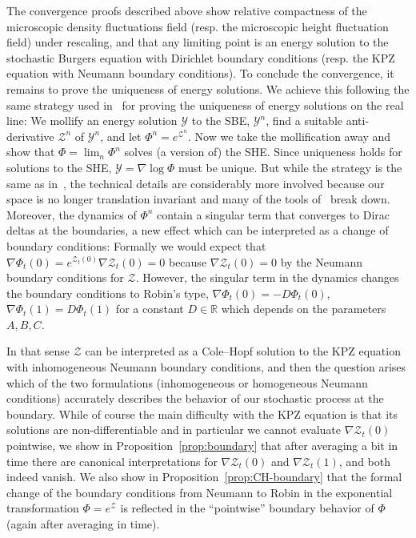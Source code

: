 \documentclass[AHL,Unicode,longabstracts]{cedram}
\newcommand{\bb}[1]{{\mathbb #1}}
\newcommand{\mc}[1]{{\mathcal #1}}
\renewcommand{\mc}[1]{{\mathcal #1}}
\begin{document}
The convergence proofs described above show relative compactness of the microscopic density fluctuations field (resp. the microscopic height fluctuation field) under rescaling, and that any limiting point is an energy solution to the stochastic Burgers equation with Dirichlet boundary conditions (resp. the KPZ equation with Neumann boundary conditions). To conclude the convergence, it remains to prove the uniqueness of energy solutions. We achieve this following the same strategy used in~\cite{Gubinelli2015Energy} for proving the uniqueness of energy solutions on the real line: We mollify an energy solution $\mc Y$ to the SBE, $\mc Y^n$, find a suitable anti-derivative $\mc Z^n$ of $\mc Y^n$, and let $\Phi^n = e^{\mc Z^n}$. Now we take the mollification away and show that $\Phi = \lim_n \Phi^n$ solves (a version of) the SHE. Since uniqueness holds for solutions to the SHE, $\mc Y = \nabla \log \Phi$ must be unique. But while the strategy is the same as in~\cite{Gubinelli2015Energy}, the technical details are considerably more involved because our space is no longer translation invariant and many of the tools of~\cite{Gubinelli2015Energy} break down. Moreover, the dynamics of $\Phi^n$ contain a singular term that converges to Dirac deltas at the boundaries, a new effect which can be interpreted as a change of boundary conditions: Formally we would expect that $\nabla \Phi_t(0) = e^{\mc Z_t(0)} \nabla \mc Z_t(0) = 0$ because $\nabla \mc Z_t(0) = 0$ by the Neumann boundary conditions for $\mc Z$. However, the singular term in the dynamics changes the boundary conditions to Robin's type, $\nabla \Phi_t(0) = -D \Phi_t(0)$, $\nabla \Phi_t(1) = D \Phi_t(1)$ for a constant $D \in \bb R$ which depends on the parameters $A,B,C$.

In that sense $\mc Z$ can be interpreted as a Cole--Hopf solution to the KPZ equation with inhomogeneous Neumann boundary conditions, and then the question arises which of the two formulations (inhomogeneous or homogeneous Neumann conditions) accurately describes the behavior of our stochastic process at the boundary. While of course the main difficulty with the KPZ equation is that its solutions are non-differentiable and in particular we cannot evaluate $\nabla \mc Z_t(0)$ pointwise, we show in Proposition~\ref{prop:boundary} that after averaging a bit in time there are canonical interpretations for $\nabla \mc Z_t(0)$ and $\nabla \mc Z_t(1)$, and both indeed vanish. We also show in Proposition~\ref{prop:CH-boundary} that the formal change of the boundary conditions from Neumann to Robin in the exponential transformation $\Phi = e^{\mc Z}$ is reflected in the ``pointwise'' boundary behavior of $\Phi$ (again after averaging in time).
\end{document}
